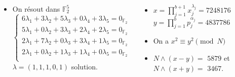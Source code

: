 \documentclass{beamer}
\begin{document}
\begin{frame}




{\small
\begin{columns}
\begin{itemize}[<+->]
    \item On résout dans $\mathbb F_2^5$
    \[
    \begin{cases}
    6\lambda_1 + 3\lambda_2 + 5\lambda_3 + 0\lambda_4 + 3\lambda_5 = 0_{\mathbb F_2} \\
    5\lambda_1 + 0\lambda_2 + 3\lambda_3 + 2\lambda_4 + 2\lambda_5 = 0_{\mathbb F_2} \\
    2\lambda_1 + 7\lambda_2 + 0\lambda_3 + 3\lambda_4 + 1\lambda_5 = 0_{\mathbb F_2} \\
    2\lambda_1 + 0\lambda_2 + 1\lambda_3 + 1\lambda_4 + 0\lambda_5 = 0_{\mathbb F_2} \\
    \end{cases}
    \]
    $\lambda = (1, 1, 1, 0, 1)$ solution.
\end{itemize}

\begin{itemize}[<+->]
    \item $x = \prod_{j=1}^{b+1}x_j^{\lambda_j} = 7248176$ \\ $y = \prod_{j=1}^b p_j^{\alpha_j} = 4837786$
    \item On a $x^2 \equiv y^2 \pmod N$
    \item $N \land (x-y) =$ \alert<6>{$5879$} et $N \land  (x+y) =$ \alert<6>{$3467$}.
\end{itemize}

\end{columns}
}
\end{frame}
\end{document}
